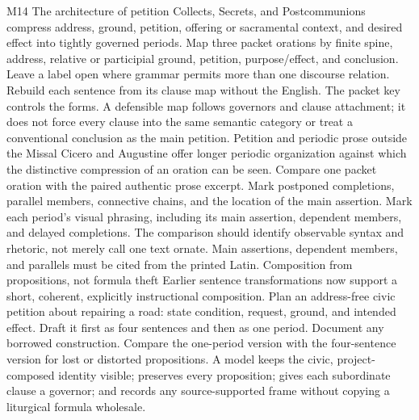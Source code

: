 \begin{courseunit}{M14}
\SubmoduleExtension
  {The architecture of petition}
  {Collects, Secrets, and Postcommunions compress address, ground, petition,
  offering or sacramental context, and desired effect into tightly governed
  periods.}
  {Map three packet orations by finite spine, address, relative or participial
  ground, petition, purpose/effect, and conclusion.  Leave a label open where
  grammar permits more than one discourse relation.}
  {Rebuild each sentence from its clause map without the English.}
  {The packet key controls the forms.  A defensible map follows governors and
  clause attachment; it does not force every  clause into the same
  semantic category or treat a conventional conclusion as the main petition.}
\SubmoduleExtension
  {Petition and periodic prose outside the Missal}
  {Cicero and Augustine offer longer periodic organization against which the
  distinctive compression of an oration can be seen.}
  {Compare one packet oration with the paired authentic prose excerpt.  Mark
  postponed completions, parallel members, connective chains, and the location
  of the main assertion.}
  {Mark each period's visual phrasing, including its main assertion, dependent
  members, and delayed completions.}
  {The comparison should identify observable syntax and rhetoric, not merely
  call one text ornate.  Main assertions, dependent members, and parallels
  must be cited from the printed Latin.}
\SubmoduleExtension
  {Composition from propositions, not formula theft}
  {Earlier sentence transformations now support a short, coherent, explicitly
  instructional composition.}
  {Plan an address-free civic petition about repairing a road: state condition,
  request, ground, and intended effect.  Draft it first as four sentences and
  then as one period.  Document any borrowed construction.}
  {Compare the one-period version with the four-sentence version for lost or
  distorted propositions.}
  {A model keeps the civic, project-composed identity visible; preserves every
  proposition; gives each subordinate clause a governor; and records any
  source-supported frame without copying a liturgical formula wholesale.}
\end{courseunit}

